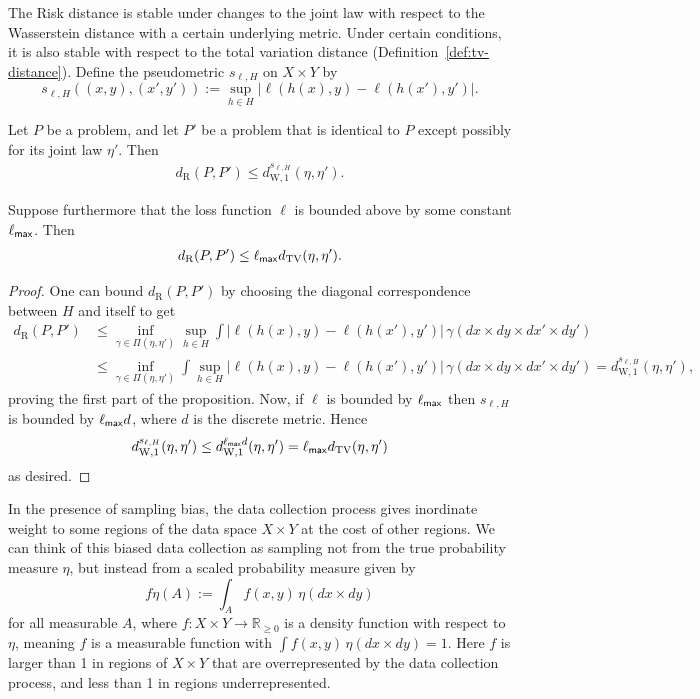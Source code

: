 \documentclass[twoside,11pt]{article}
\newcommand{\dexp}[1][]{d_{\mathrm{R}#1}}
\newcommand{\dWp}[1]{d_{\mathrm{W},#1}}
\newcommand{\dW}{\dWp 1}
\newcommand{\TV}{d_{\mathrm{TV}}}
\begin{document}
    The Risk distance is stable under changes to the joint law with respect to the Wasserstein distance with a certain underlying metric. Under certain conditions, it is also stable with respect to the total variation distance (Definition~\ref{def:tv-distance}).
    Define the pseudometric $s_{\ell,H}$ on $X\times Y$ by
    \[s_{\ell,H}((x,y),(x',y')) := \sup_{h\in H} \big | \ell(h(x),y) - \ell(h(x'),y') \big |.\]
    \begin{proposition}\label{prop:H-wasserstein-bound}
        Let $P$ be a problem, and let $P'$ be a problem that is identical to $P$ except possibly for its joint law $\eta'$. Then
        \begin{align*}
            \dexp(P,P') \leq \dW^{s_{\ell,H}}(\eta,\eta').
        \end{align*}

        Suppose furthermore that the loss function $\ell$ is bounded above by some constant $\ell_{\sf{max}}$. Then
        \begin{align*}
            \dexp(P,P') \leq \ell_{\sf{max}}\TV(\eta,\eta').
        \end{align*}
    \end{proposition}
    \begin{proof}
        One can bound $\dexp(P,P')$ by choosing the diagonal correspondence between $H$ and itself to get
        \begin{align*}
            \dexp(P,P')
            & \leq
            \inf_{\gamma \in \Pi(\eta,\eta')} \sup_{h\in H} \int \big|\ell(h(x),y) - \ell(h(x'),y') \big| \, \gamma(dx {\times} dy {\times} dx' {\times} dy')
            \\ & \leq
            \inf_{\gamma \in \Pi(\eta,\eta')} \int \sup_{h\in H} \big|\ell(h(x),y) - \ell(h(x'),y') \big| \, \gamma(dx {\times} dy {\times} dx' {\times} dy')
            = \dW^{s_{\ell,H}}(\eta,\eta'),
        \end{align*}
        proving the first part of the proposition. Now, if $\ell$ is bounded by $\ell_{\sf{max}}$ then $s_{\ell,H}$ is bounded by $\ell_{\sf{max}}d$, where $d$ is the discrete metric. Hence
        \begin{equation*}
            \dW^{s_{\ell,H}}(\eta,\eta') \leq \dW^{\ell_{\sf{max}}d}(\eta,\eta') = \ell_{\sf{max}}\TV(\eta,\eta') %
        \end{equation*}
        as desired.
    \end{proof}

    In the presence of sampling bias, the data collection process gives inordinate weight to some regions of the data space $X\times Y$ at the cost of other regions. We can think of this biased data collection as sampling not from the true probability measure $\eta$, but instead from a scaled probability measure given by
    \[f\eta(A) := \int_A f(x,y)\, \eta(dx\times dy)\]
    for all measurable $A$, where $f:X\times Y \to \mathbb R_{\geq 0}$ is a density function with respect to $\eta$, meaning $f$ is a measurable function with $\int f(x,y)\,\eta(dx{\times} dy) = 1$. Here $f$ is larger than 1 in regions of $X\times Y$ that are overrepresented by the data collection process, and less than 1 in regions underrepresented.
\end{document}

